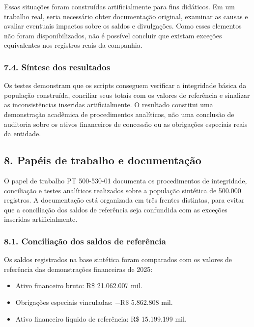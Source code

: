 \documentclass[
]{article}
\providecommand{\tightlist}{%
  \setlength{\itemsep}{0pt}\setlength{\parskip}{0pt}}
\begin{document}
Essas situações foram construídas artificialmente para fins didáticos.
Em um trabalho real, seria necessário obter documentação original,
examinar as causas e avaliar eventuais impactos sobre os saldos e
divulgações. Como esses elementos não foram disponibilizados, não é
possível concluir que existam exceções equivalentes nos registros reais
da companhia.

\subsubsection{7.4. Síntese dos
resultados}\label{suxedntese-dos-resultados}

Os testes demonstram que os scripts conseguem verificar a integridade
básica da população construída, conciliar seus totais com os valores de
referência e sinalizar as inconsistências inseridas artificialmente. O
resultado constitui uma demonstração acadêmica de procedimentos
analíticos, não uma conclusão de auditoria sobre os ativos financeiros
de concessão ou as obrigações especiais reais da entidade.

\subsection{8. Papéis de trabalho e
documentação}\label{papuxe9is-de-trabalho-e-documentauxe7uxe3o}

O papel de trabalho PT 500-530-01 documenta os procedimentos de
integridade, conciliação e testes analíticos realizados sobre a
população sintética de 500.000 registros. A documentação está organizada
em três frentes distintas, para evitar que a conciliação dos saldos de
referência seja confundida com as exceções inseridas artificialmente.

\subsubsection{8.1. Conciliação dos saldos de
referência}\label{conciliauxe7uxe3o-dos-saldos-de-referuxeancia}

Os saldos registrados na base sintética foram comparados com os valores
de referência das demonstrações financeiras de 2025:

\begin{itemize}
\tightlist
\item
  Ativo financeiro bruto: R\$ 21.062.007 mil.
\item
  Obrigações especiais vinculadas: −R\$ 5.862.808 mil.
\item
  Ativo financeiro líquido de referência: R\$ 15.199.199 mil.
\end{itemize}
\end{document}
